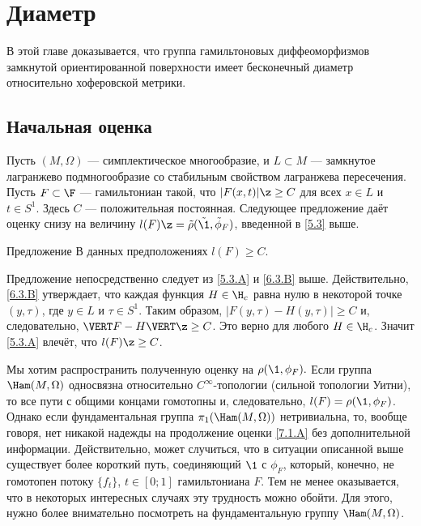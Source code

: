 \chapter{Диаметр}

В этой главе доказывается, что группа гамильтоновых диффеоморфизмов замкнутой ориентированной поверхности имеет бесконечный диаметр относительно хоферовской метрики.

\section{Начальная оценка}
Пусть $(M, \Omega)$ --- симплектическое многообразие, и $L \subset M$ --- замкнутое лагранжево подмногообразие со стабильным свойством  лагранжева пересечения.
Пусть $F \subset \F$ --- гамильтониан такой, что $| F (x, t) | \z\ge C$ для всех $x \in L$ и $t \in S^1$.
Здесь $C$ --- положительная постоянная.
Следующее предложение даёт оценку снизу на величину $l (F) \z= \tilde\rho (\tilde\1, \tilde\phi_F)$, введенной в \ref{5.3} выше.

\begin{thm}{Предложение}\label{7.1.A}
В данных предположениях $l (F) \ge C$.
\end{thm}

Предложение непосредственно следует из \ref{5.3.A} и \ref{6.3.B} выше.
Действительно, \ref{6.3.B} утверждает, что каждая функция $H \in \H_c$ равна нулю в некоторой точке $(y, \tau)$, где $y \in L$ и $\tau \in S^1$.
Таким образом, $| F (y, \tau) - H (y, \tau) | \ge C$ и, следовательно, $\VERT F - H \VERT \z\ge C$.
Это верно для любого $H \in \H_c$.
Значит \ref{5.3.A} влечёт, что $l (F) \z\ge C$.
\qeds

Мы хотим распространить полученную оценку на $\rho (\1, \phi_F).$
Если группа $\Ham (M, \Omega)$ односвязна относительно $C^\infty$-топологии (сильной топологии Уитни), то все пути с общими концами гомотопны и, следовательно, $l (F) = \rho (\1, \phi_F)$.
Однако если фундаментальная группа $\pi_1 (\Ham (M, \Omega))$ нетривиальна, то, вообще говоря, нет никакой надежды на продолжение оценки \ref{7.1.A} без дополнительной информации.
Действительно, может случиться, что в ситуации описанной выше существует более короткий путь, соединяющий $\1$ с $\phi_F$, который, конечно, не гомотопен потоку $\{f_t\}$, $t \in [0; 1]$ гамильтониана $F$.
Тем не менее оказывается, что в некоторых интересных случаях эту трудность можно обойти.
Для этого, нужно более внимательно посмотреть на фундаментальную группу $\Ham (M, \Omega)$.

